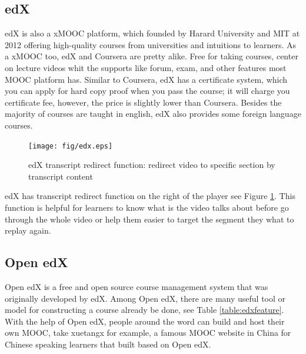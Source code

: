 \subsection{edX}
edX \cite{edx} is also a xMOOC platform, which founded by Harard University and MIT at 2012 offering high-quality courses from universities and intuitions to learners.
As a xMOOC too, edX and Coursera are pretty alike. Free for taking courses, center on lecture videos whit the supports like forum, exam, and other features most MOOC platform has.
Similar to Coursera, edX has a certificate system, which you can apply for hard copy proof when you pass the course; it will charge you certificate fee, however, the price is slightly lower than Coursera.
Besides the majority of courses are taught in english, edX also provides some foreign language courses.
\begin{figure}[H]
    \centering
    \texttt{[image: fig/edx.eps]}
    \caption{edX transcript redirect function: redirect video to specific section by transcript content}
    \label{fig:edx}
\end{figure}
edX has transcript redirect function on the right of the player see Figure \ref{fig:edx}.
This function is helpful for learners to know what is the video talks about before go through the whole video or help them easier to target the segment they what to replay again.

\subsection{Open edX}
Open edX is a free and open source course management system that was originally developed by edX.
Among Open edX, there are many useful tool or model for constructing a course already be done, see Table \ref{table:edxfeature}.
With the help of Open edX, people around the word can build and host their own MOOC, take xuetangx \cite{xuetangx} for example, a famous MOOC website in China for Chinese speaking learners that built based on Open edX.

